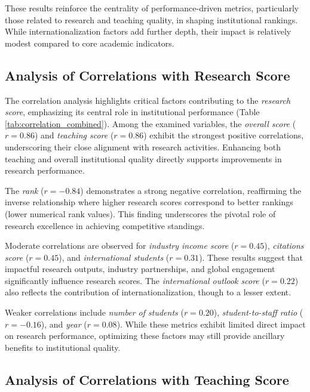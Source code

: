 \documentclass[conference]{IEEEtran}
\begin{document}
These results reinforce the centrality of performance-driven metrics, particularly those related to research and teaching quality, in shaping institutional rankings. While internationalization factors add further depth, their impact is relatively modest compared to core academic indicators.



\subsection{Analysis of Correlations with Research Score}

The correlation analysis highlights critical factors contributing to the \textit{research score}, emphasizing its central role in institutional performance (Table \ref{tab:correlation_combined}). Among the examined variables, the \textit{overall score} ($r = 0.86$) and \textit{teaching score} ($r = 0.86$) exhibit the strongest positive correlations, underscoring their close alignment with research activities. Enhancing both teaching and overall institutional quality directly supports improvements in research performance.

The \textit{rank} ($r = -0.84$) demonstrates a strong negative correlation, reaffirming the inverse relationship where higher research scores correspond to better rankings (lower numerical rank values). This finding underscores the pivotal role of research excellence in achieving competitive standings.

Moderate correlations are observed for \textit{industry income score} ($r = 0.45$), \textit{citations score} ($r = 0.45$), and \textit{international students} ($r = 0.31$). These results suggest that impactful research outputs, industry partnerships, and global engagement significantly influence research scores. The \textit{international outlook score} ($r = 0.22$) also reflects the contribution of internationalization, though to a lesser extent.

Weaker correlations include \textit{number of students} ($r = 0.20$), \textit{student-to-staff ratio} ($r = -0.16$), and \textit{year} ($r = 0.08$). While these metrics exhibit limited direct impact on research performance, optimizing these factors may still provide ancillary benefits to institutional quality.


\subsection{Analysis of Correlations with Teaching Score}
\end{document}
